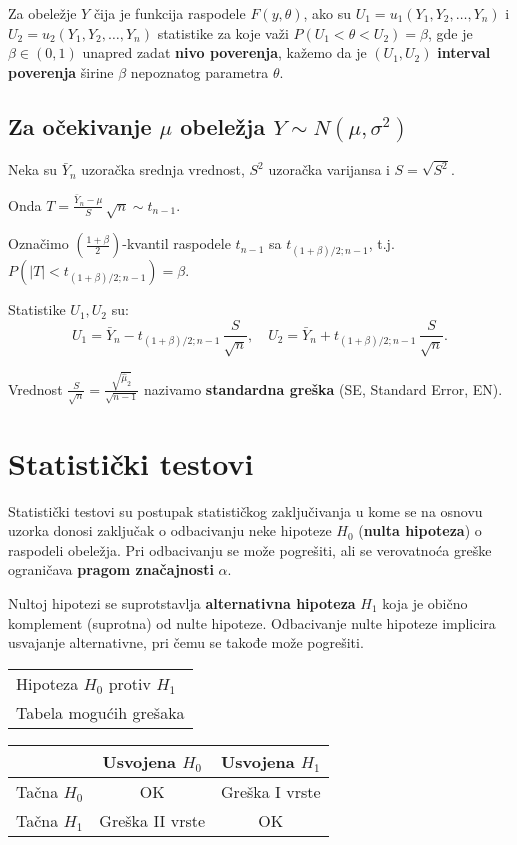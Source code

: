 \documentclass[twoside,titlepage,12pt,a4paper]{book}
\numberwithin{equation}{chapter}
\begin{document}
Za obeležje $Y$ čija je funkcija raspodele $F ( y, \theta )$, ako su $U_1 = u_1( Y_1, Y_2, \ldots, Y_n )$ i $U_2 = u_2( Y_1, Y_2, \ldots, Y_n )$ statistike za koje važi \(P ( U_1 < \theta < U_2 ) = \beta\), gde je $\beta \in ( 0, 1 )$ unapred zadat \textbf{nivo poverenja}, kažemo da je $(U_1, U_2)$ \textbf{interval poverenja} širine $\beta$ nepoznatog parametra $\theta$.

\subsection{Za očekivanje $\mu$ obeležja $Y \sim N ( \mu, \sigma^2 )$}

Neka su $\bar{Y}_n$ uzoračka srednja vrednost, $S^2$ uzoračka varijansa i $S = \sqrt{S^2}$.

Onda $\displaystyle T = \frac{\bar{Y}_n - \mu}{S} \, \sqrt{n} \sim t_{n-1}$.

Označimo $\left( \frac{1+\beta}{2} \right)$-kvantil raspodele $t_{n-1}$ sa $t_{(1+\beta)/2; n-1}$, t.j.\ \(\displaystyle P \left( \left| T \right| < t_{(1+\beta)/2; n - 1} \right) = \beta\). 

Statistike $U_1, U_2$ su:
$$ U_1 = \bar{Y}_n - t_{(1+\beta)/2; n - 1} \, \frac{S}{\sqrt{n}},\quad  U_2 = \bar{Y}_n + t_{(1+\beta)/2; n - 1} \, \frac{S}{\sqrt{n}}.$$

Vrednost $\displaystyle \frac{S}{\sqrt{n}} = \frac{\sqrt{\hat{\mu}_2}}{\sqrt{n-1}}$ nazivamo \textbf{standardna greška} (SE, Standard Error, EN).


\section{Statistički testovi}

Statistički testovi su postupak statističkog zaključivanja u kome se na osnovu uzorka donosi zaključak o odbacivanju neke hipoteze $H_0$ (\textbf{nulta hipoteza}) o raspodeli obeležja. Pri odbacivanju se može pogrešiti, ali se verovatnoća greške ograničava \textbf{pragom značajnosti} $\alpha$.

Nultoj hipotezi se suprotstavlja \textbf{alternativna hipoteza} $H_1$ koja je obično komplement (suprotna) od nulte hipoteze. Odbacivanje nulte hipoteze implicira usvajanje alternativne, pri čemu se takođe može pogrešiti.

\begin{tabular}{l}
Hipoteza $H_0$ protiv $H_1$\\[8pt]
Tabela mogućih grešaka
\end{tabular}
\hfill
\begin{tabular}{c|c|c}
       &  Usvojena $H_0$ & Usvojena $H_1$ \\\hline
Tačna $H_0$  &      OK         & Greška I vrste \\\hline
Tačna $H_1$  & Greška II vrste &      OK        \\
\end{tabular}\hfill\makebox{}\\
\end{document}
